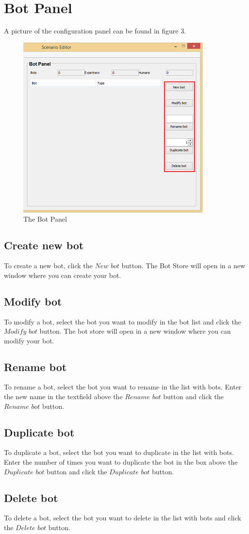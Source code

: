 \documentclass[a4paper]{article}
\begin{document}
\section{Bot Panel}
A picture of the configuration panel can be found in figure 3.
\begin{figure}
\includegraphics{bot.png}
\caption{The Bot Panel}
\end{figure}
\subsection{Create new bot}
To create a new bot, click the $New$ $bot$ button. The Bot Store will open in a new window where you can create your bot.

\subsection{Modify bot}
To modify a bot, select the bot you want to modify in the bot list and click the $Modify$ $bot$ button. The bot store will open in a new window where you can modify your bot.

\subsection{Rename bot}
To rename a bot, select the bot you want to rename in the list with bots. Enter the new name in the textfield above the $Rename$ $bot$ button and click the $Rename$ $bot$ button.

\subsection{Duplicate bot}
To duplicate a bot, select the bot you want to duplicate in the list with bots. Enter the number of times you want to duplicate the bot in the box above the $Duplicate$ $bot$ button and click the $Duplicate$ $bot$ button.

\subsection{Delete bot}
To delete a bot, select the bot you want to delete in the list with bots and click the $Delete$ $bot$ button.
\end{document}
